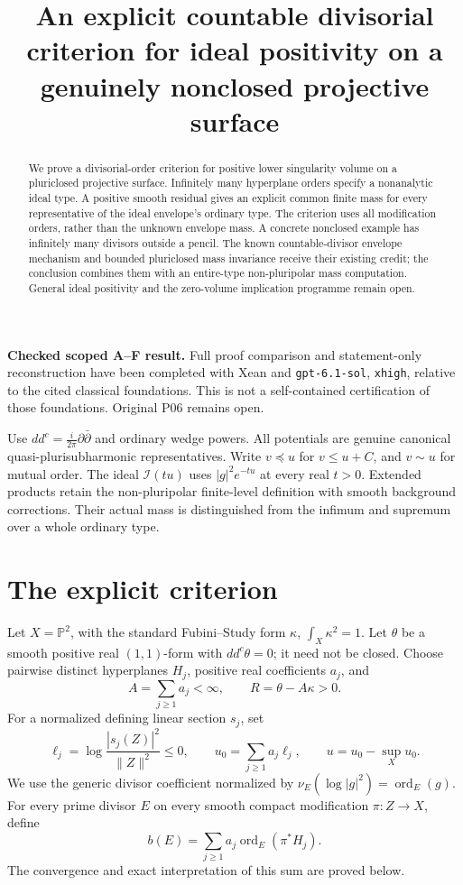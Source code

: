\documentclass[11pt]{article}
\title{An explicit countable divisorial criterion for ideal positivity\newline
on a genuinely nonclosed projective surface}
\author{}\date{}
\newcommand{\ddc}{dd^c}
\theoremstyle{remark}\newtheorem{remark}[theorem]{Remark}
\begin{document}
\maketitle
\noindent\textbf{Checked scoped A--F result.} Full proof comparison and
statement-only reconstruction have been completed with Xean and
\texttt{gpt-6.1-sol}, \texttt{xhigh}, relative to the cited classical
foundations. This is not a self-contained certification of those
foundations. Original P06 remains open.
\begin{abstract}
We prove a divisorial-order criterion for positive lower singularity
volume on a pluriclosed projective surface. Infinitely many hyperplane
orders specify a nonanalytic ideal type. A positive smooth residual gives
an explicit common finite mass for every representative of the ideal
envelope's ordinary type. The criterion uses all modification orders,
rather than the unknown envelope mass. A concrete nonclosed example has
infinitely many divisors outside a pencil. The known countable-divisor
envelope mechanism and bounded pluriclosed mass invariance receive their
existing credit; the conclusion combines them with an entire-type
non-pluripolar mass computation. General ideal positivity and the
zero-volume implication programme remain open.
\end{abstract}

Use $\ddc=\frac{i}{2\pi}\partial\bar\partial$ and ordinary wedge powers.
All potentials are genuine canonical quasi-plurisubharmonic representatives.
Write $v\preceq u$ for $v\leq u+C$, and $v\sim u$ for mutual order.
The ideal $\mathcal I(tu)$ uses $|g|^2e^{-tu}$ at every real $t>0$.
Extended products retain the non-pluripolar finite-level definition with
smooth background corrections. Their actual mass is distinguished from
the infimum and supremum over a whole ordinary type.

\section{The explicit criterion}
Let $X=\mathbb P^2$, with the standard Fubini--Study form $\kappa$,
$\int_X\kappa^2=1$. Let $\theta$ be a smooth positive real $(1,1)$-form
with $\ddc\theta=0$; it need not be closed. Choose pairwise distinct
hyperplanes $H_j$, positive real coefficients $a_j$, and
\[
 A=\sum_{j\geq1}a_j<\infty,\qquad R=\theta-A\kappa>0.
\]
For a normalized defining linear section $s_j$, set
\[
 \ell_j=\log\frac{|s_j(Z)|^2}{\|Z\|^2}\leq0,
 \qquad u_0=\sum_{j\geq1}a_j\ell_j,
 \qquad u=u_0-\sup_Xu_0.
\]
We use the generic divisor coefficient normalized by
$\nu_E(\log|g|^2)=\operatorname{ord}_E(g)$.
For every prime divisor $E$ on every smooth compact modification
$\pi:Z\to X$, define
\begin{equation}\label{eq:profile}
 b(E)=\sum_{j\geq1}a_j\operatorname{ord}_E(\pi^*H_j).
\end{equation}
The convergence and exact interpretation of this sum are proved below.
\end{document}
